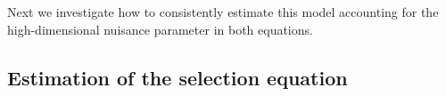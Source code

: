 \documentclass[11pt]{article}
\begin{document}
Next we investigate how to consistently estimate this model accounting for the high-dimensional nuisance parameter in both equations.

\begin{comment}

\begin{prop} \label{prop:sampford}
The vector $\omega$ in Eq.~(\ref{eq:y1cond2}) inherits the same  sparsity properties as the vector $\eta$, i.e.~$||\omega||_0=||\etab||_0$.
\end{prop}

In
order to apply the double-selection Lasso in \cite{belloni/etal:13} to a linear
model, we assume that $\zvar'\omega$ can be approximated by a sparse linear
model.

\begin{assumption} \label{assump:sparsity2}
We assume $\zvar'\omega = \zvar'\zeta + \epsilon_z$, with $\zeta$ to be a sparse
non-random coefficient vector, and $\epsilon_z$ is mean-zero approximation
errors uncorrelated to $\zvar$ and $\xvar$. 
\end{assumption}

\dil{(!! We need to justify Assumption \ref{assump:sparsity2}.  Suppose $\zeta =
\gamma \E(\lambda^{(1)}(q)) \eta$, then it is indeed sparse if $\eta$ is sparse.
However, it implies $\epsilon_z = \zvar \gamma (\lambda^{(1)}(q) -
\E(\lambda^{(1)}(q))) \eta$, and $\epsilon_z$ will not be independent from
$\xvar$ and $\zvar$ because the point $q$ depends on them.)}
Cite the boundedness result from Sampford 1953.

Under Assumption \ref{assump:sparsity2} and Equation (\ref{eq:y1cond}), we can
write $\E(\yvar_{1} | \xvar, \zvar, y_2 = 1)$ as
\begin{align}
\E(\yvar_{1} | \xvar, \zvar, y_2 = 1) 
	&= \xvar_1'\alphab + \gamma \lambda(\xvar'\betab) 
	+ \zvar'\zeta  \label{eq:y1cond2linear}
\end{align}

Under Assumption \ref{assump:heckman} and Equation (\ref{eq:y2}), we can write 
$\Pr(\yvar_2 = 1 | \xvar, \zvar)$ as
\begin{align}
\Pr(\yvar_2 = 1 | \xvar, \zvar) = \Phi(\xvar'\beta + \zvar'\eta)
\label{eq:y2cond}
\end{align}

\end{comment}
	\subsection{Estimation of the selection equation}
\end{document}
